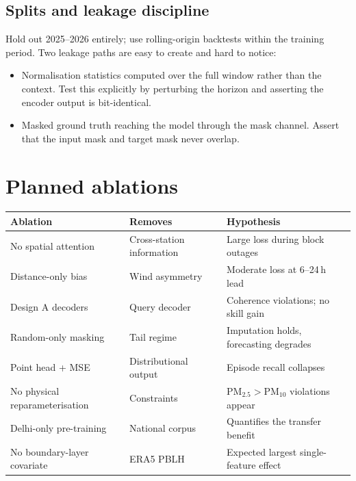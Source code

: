 \documentclass[11pt,a4paper]{article}
\begin{document}
\subsection{Splits and leakage discipline}

Hold out 2025--2026 entirely; use rolling-origin backtests within the training
period. Two leakage paths are easy to create and hard to notice:

\begin{itemize}[leftmargin=1.4em]
\item Normalisation statistics computed over the full window rather than the
context. Test this explicitly by perturbing the horizon and asserting the
encoder output is bit-identical.
\item Masked ground truth reaching the model through the mask channel. Assert
that the input mask and target mask never overlap.
\end{itemize}

\section{Planned ablations}

\begin{table}[h]
\centering
\small
\begin{tabular}{@{}lll@{}}
\toprule
Ablation & Removes & Hypothesis \\
\midrule
No spatial attention & Cross-station information & Large loss during block outages \\
Distance-only bias & Wind asymmetry & Moderate loss at 6--24\,h lead \\
Design A decoders & Query decoder & Coherence violations; no skill gain \\
Random-only masking & Tail regime & Imputation holds, forecasting degrades \\
Point head + MSE & Distributional output & Episode recall collapses \\
No physical reparameterisation & Constraints & PM$_{2.5}>$PM$_{10}$ violations appear \\
Delhi-only pre-training & National corpus & Quantifies the transfer benefit \\
No boundary-layer covariate & ERA5 PBLH & Expected largest single-feature effect \\
\bottomrule
\end{tabular}
\end{table}
\end{document}

